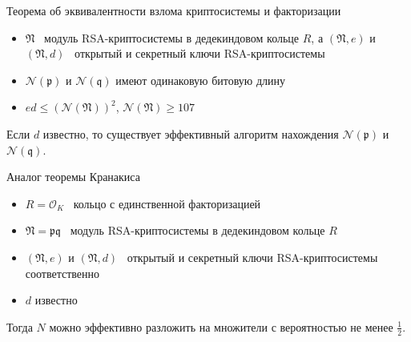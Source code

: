 \documentclass[8pt, xcolor=x11names]{beamer}
\begin{document}
\begin{frame}
    \begin{block}{Теорема об эквивалентности взлома криптосистемы и факторизации}
        \begin{itemize}
            \item $\mathfrak{N}$ \textendash\ модуль RSA-криптосистемы в дедекиндовом кольце $R$, а $(\mathfrak{N}, e)$ и $(\mathfrak{N}, d)$ \textendash\ открытый и секретный ключи RSA-криптосистемы
            
            \item $\mathcal{N}(\mathfrak{p})$ и $\mathcal{N}(\mathfrak{q})$ имеют одинаковую битовую длину
            
            \item $ed \le (\mathcal{N}(\mathfrak{N}))^2$, $\mathcal{N}(\mathfrak{N}) \ge 107$
        \end{itemize}
        Если $d$ известно, то существует эффективный алгоритм нахождения $\mathcal{N}(\mathfrak{p})$ и $\mathcal{N}(\mathfrak{q})$.
    \end{block}
    
    \begin{block}{Аналог теоремы Кранакиса}
        \begin{itemize}
            \item $R = \mathcal{O}_K$ \textendash\ кольцо с единственной факторизацией
            
            \item  $\mathfrak{N} = \mathfrak{p}\mathfrak{q}$ \textendash\ модуль RSA-криптосистемы в дедекиндовом кольце $R$
            
            \item $(\mathfrak{N}, e)$ и $(\mathfrak{N}, d)$ \textendash\ открытый и секретный ключи RSA-криптосистемы соответственно
            
            \item $d$ известно
        \end{itemize}
        Тогда $N$ можно эффективно разложить на множители с вероятностью не менее $\frac{1}{2}$.
    \end{block}
\end{frame}
\end{document}
